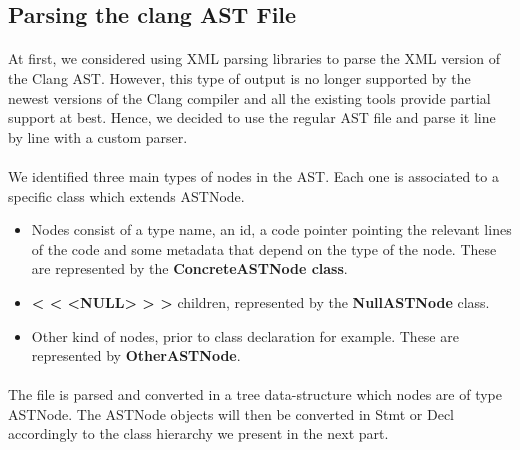 \documentclass{report}
\begin{document}
\subsection{Parsing the clang AST File}

\paragraph{}
\hspace{4mm}At first, 
we considered using XML parsing libraries to parse 
the XML version of the Clang AST. 
However, this type of output is no longer supported by the newest
 versions of the Clang compiler and all the existing tools
provide partial support at best. Hence, we decided to use the
 regular AST file and parse it line by line with a custom parser.

\paragraph{}
\hspace{4mm}We identified three main types of nodes in the AST. 
Each one is associated to a specific class which extends ASTNode.

\vspace{1.5mm}
\begin{itemize}
\item Nodes consist of a type name, an id, a code pointer pointing 
the relevant lines of the code and some metadata that depend on
 the type of the node. These are represented by the 
\textbf{ConcreteASTNode class}.\vspace{1mm}
\item \textbf{< < <NULL> > >} children, represented by the \textbf{NullASTNode} class.\vspace{1mm}
\item Other kind of nodes, prior to class declaration for example.
 These are represented by \textbf{OtherASTNode}.\vspace{1mm}
\end{itemize}

\paragraph{}
\hspace{4mm}The file is parsed and converted in a tree data-structure 
which nodes are of type ASTNode. 
The ASTNode objects will then be converted in Stmt or Decl 
accordingly to the class hierarchy we present in the next part.
\end{document}

